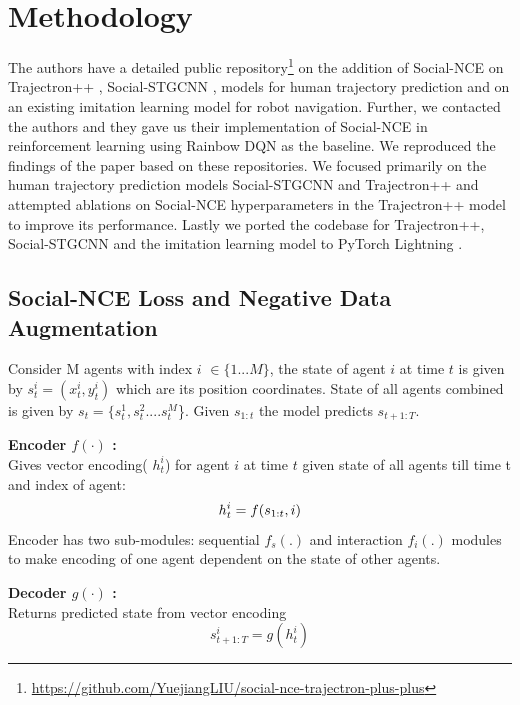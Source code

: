 \section{Methodology}
The authors have a detailed public repository\footnote{\href{https://github.com/YuejiangLIU/social-nce-trajectron-plus-plus}{https://github.com/YuejiangLIU/social-nce-trajectron-plus-plus}} on the addition of Social-NCE on Trajectron++ \cite{salzmann2020trajectron++}, Social-STGCNN \cite{mohamed2020social}, models for human trajectory prediction and on an existing imitation learning model \cite{chen2019crowdnav} for robot navigation. Further, we contacted the authors and they gave us their implementation of Social-NCE in reinforcement learning using Rainbow DQN \cite{hessel2017rainbow} as the baseline. We reproduced the findings of the paper based on these repositories. We focused primarily on the human trajectory prediction models Social-STGCNN and Trajectron++ and attempted ablations on Social-NCE hyperparameters in the Trajectron++ model to improve its performance. Lastly we ported the codebase for Trajectron++, Social-STGCNN and the imitation learning model to PyTorch Lightning \cite{falcon2019pytorch}.

\vspace{90pt}

\subsection{Social-NCE Loss and Negative Data Augmentation}


Consider M agents with index $i$ 	$\in \{1...M\}$, 
the state of agent $i$ at time $t$ is given by $s^{i}_{t} = (x^{i}_{t}, y^{i}_{t})$ which are its position coordinates. 
State of all agents combined is given by $s_t = \{s^{1}_{t}, s^{2}_{t}....s^{M}_{t}$\}.  
Given $s_{1:t}$ the model predicts $s_{t+1:T}$.

{\bf {Encoder $f(\cdot)$ :}}
\\
Gives vector encoding( ${h^{i}_{t}}$) for agent $i$ at time $t$ given state of all agents till time t and index of agent:
\begin{equation}
h^{i}_{t} = f(s_{1:t}, i)\\
\end{equation}
Encoder has two sub-modules: sequential $f_s(.)$ and interaction $f_i(.)$ modules to make encoding of one agent dependent on the state of other agents.

{\bf {Decoder $g(\cdot)$ :}} 
\\
Returns predicted state from vector encoding
\begin{equation}
{s^{i}_{t+1:T}} = g(h^{i}_{t})
\end{equation}





